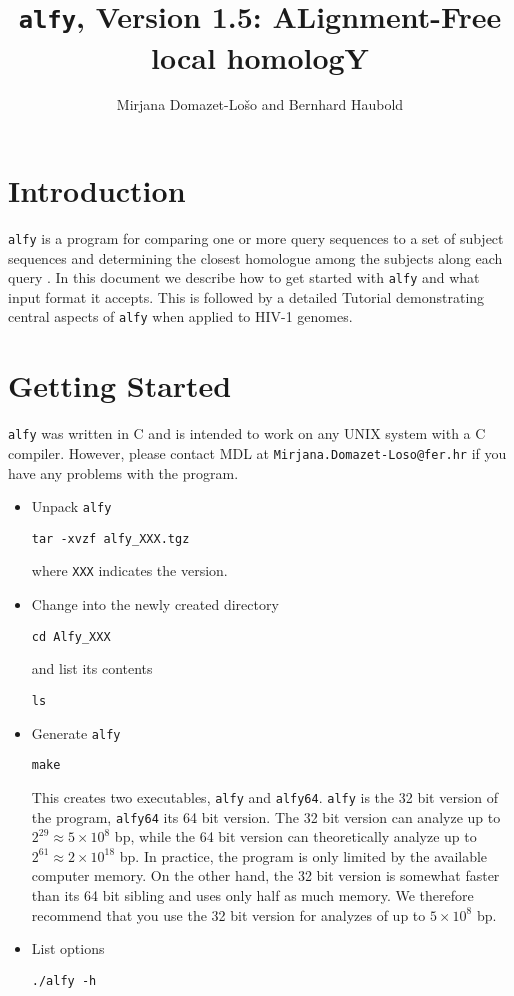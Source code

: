 \documentclass{article}
\newcommand{\bi}{\begin{itemize}}
\newcommand{\ei}{\end{itemize}}
\newcommand{\I}{\item}
\newcommand{\ty}{\texttt}
\newcommand{\version}{1.5}
\begin{document}
\title{\ty{alfy}, Version \version: ALignment-Free local homologY}
\author{Mirjana Domazet-Lo\v{s}o and Bernhard Haubold}
\maketitle

\section{Introduction}
\ty{alfy} is a program for comparing one or more query sequences to a
set of subject sequences and determining the closest homologue among
the subjects along each query \cite{dom11:ali}. In this document we 
describe how to get started with \ty{alfy} and what input format it
accepts. This is followed by a detailed Tutorial demonstrating central
aspects of \ty{alfy} when applied to HIV-1 genomes. 

\section{Getting Started}
\ty{alfy} was written in C and is
intended to work on any UNIX system with a C compiler. However, please contact
MDL at \ty{Mirjana.Domazet-Loso@fer.hr} if you have any problems with the
program.
\bi
\I Unpack \ty{alfy}
\begin{verbatim}
tar -xvzf alfy_XXX.tgz
\end{verbatim}
where \ty{XXX} indicates the version.
\I Change into the newly created directory
\begin{verbatim}
cd Alfy_XXX
\end{verbatim}
and list its contents
\begin{verbatim}
ls
\end{verbatim}
\I Generate \ty{alfy}
\begin{verbatim}
make
\end{verbatim}
This creates two executables, \ty{alfy} and \ty{alfy64}. \ty{alfy} is
the 32 bit version of the program, \ty{alfy64} its 64 bit version. The 32 bit version can
analyze up to $2^{29}\approx 5\times 10^8$ bp, while the 64 bit version
can theoretically analyze up to $2^{61}\approx 2\times 10^{18}$ bp. In
practice, the program is only limited by the available computer
memory. On
the other hand, the 32 bit version is somewhat faster than its 64 bit
sibling and uses only half as much memory. We therefore recommend that
you use the 32 bit version for analyzes of up to $5\times 10^8$ bp.
\I List options
\begin{verbatim}
./alfy -h
\end{verbatim}
\ei
\end{document}
